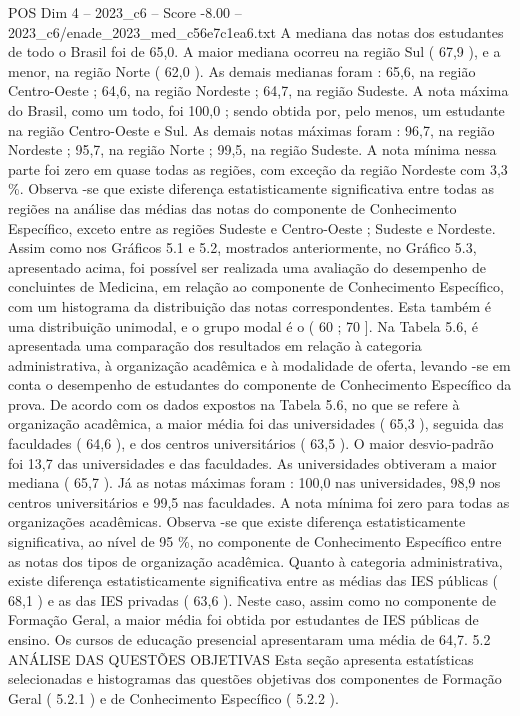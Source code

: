 \begin{textsample}{POS Dim 4 – 2023\_c6 – Score -8.00 – 2023\_c6/enade\_2023\_med\_c56e7c1ea6.txt}
A mediana das notas dos estudantes de todo o Brasil foi de 65,0.
A maior mediana ocorreu na região Sul ( 67,9 ), e a menor, na região Norte ( 62,0 ).
As demais medianas foram : 65,6, na região Centro-Oeste ; 64,6, na região Nordeste ; 64,7, na região Sudeste.
A nota máxima do Brasil, como um todo, foi 100,0 ; sendo obtida por, pelo menos, um estudante na região Centro-Oeste e Sul.
As demais notas máximas foram : 96,7, na região Nordeste ; 95,7, na região Norte ; 99,5, na região Sudeste.
A nota mínima nessa parte foi zero em quase todas as regiões, com exceção da região Nordeste com 3,3 \%.
Observa -se que existe diferença estatisticamente significativa entre todas as regiões na análise das médias das notas do componente de Conhecimento Específico, exceto entre as regiões Sudeste e Centro-Oeste ; Sudeste e Nordeste.
Assim como nos Gráficos 5.1 e 5.2, mostrados anteriormente, no Gráfico 5.3, apresentado acima, foi possível ser realizada uma avaliação do desempenho de concluintes de Medicina, em relação ao componente de Conhecimento Específico, com um histograma da distribuição das notas correspondentes.
Esta também é uma distribuição unimodal, e o grupo modal é o ( 60 ; 70 ].
Na Tabela 5.6, é apresentada uma comparação dos resultados em relação à categoria administrativa, à organização acadêmica e à modalidade de oferta, levando -se em conta o desempenho de estudantes do componente de Conhecimento Específico da prova.
De acordo com os dados expostos na Tabela 5.6, no que se refere à organização acadêmica, a maior média foi das universidades ( 65,3 ), seguida das faculdades ( 64,6 ), e dos centros universitários ( 63,5 ).
O maior desvio-padrão foi 13,7 das universidades e das faculdades.
As universidades obtiveram a maior mediana ( 65,7 ).
Já as notas máximas foram : 100,0 nas universidades, 98,9 nos centros universitários e 99,5 nas faculdades.
A nota mínima foi zero para todas as organizações acadêmicas.
Observa -se que existe diferença estatisticamente significativa, ao nível de 95 \%, no componente de Conhecimento Específico entre as notas dos tipos de organização acadêmica.
Quanto à categoria administrativa, existe diferença estatisticamente significativa entre as médias das IES públicas ( 68,1 ) e as das IES privadas ( 63,6 ).
Neste caso, assim como no componente de Formação Geral, a maior média foi obtida por estudantes de IES públicas de ensino.
Os cursos de educação presencial apresentaram uma média de 64,7. 5.2 ANÁLISE DAS QUESTÕES OBJETIVAS Esta seção apresenta estatísticas selecionadas e histogramas das questões objetivas dos componentes de Formação Geral ( 5.2.1 ) e de Conhecimento Específico ( 5.2.2 ).

\end{textsample}
